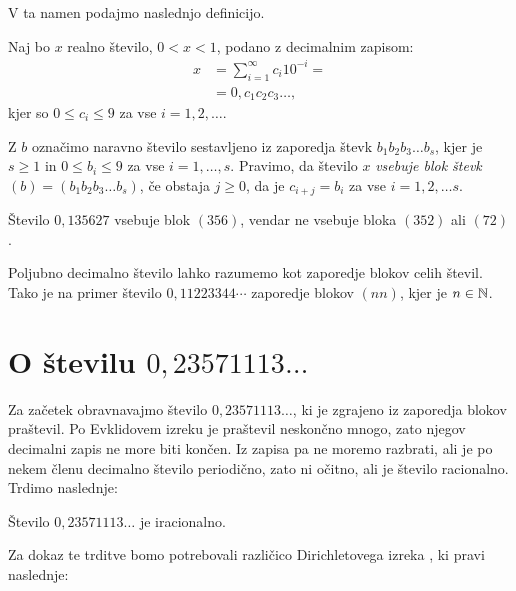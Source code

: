 \documentclass[twoside,11pt]{article}
\begin{document}
V ta namen podajmo naslednjo definicijo.

\begin{definicija}\label{defincija blokov}
    Naj bo $x$ realno število, $ 0 < x < 1$, podano z decimalnim zapisom: 
    \[ 
        \begin{split}
            x & = \sum^{\infty}_{i=1} c_i 10^{-i} = \\
            & = 0,c_1c_2c_3 \dots,
        \end{split}   
    \]
    kjer so $0 \leq c_i \leq 9$ za vse $i = 1, 2, \dots$.
    
    Z $b$ označimo naravno število sestavljeno iz zaporedja števk
    $b_1b_2b_3 \dots b_s$, 
    kjer je $s\geq 1$ in $0 \leq b_i \leq 9$ za vse $i = 1, \dots, s$.
    Pravimo, da število $x$ {\em vsebuje blok števk $(b) = (b_1b_2b_3 \dots b_s)$}, če obstaja $j \geq 0$, da je 
    $c_{i+j} = b_i$ za vse $i=1, 2, \dots s$.
\end{definicija}

\begin{zgled}
    Število $0,135627$ vsebuje blok $(356)$, vendar ne vsebuje bloka $(352)$ ali $(72)$.
\end{zgled}

Poljubno decimalno število lahko razumemo kot zaporedje blokov celih števil.
Tako je na primer število $0,11223344 \cdots$ zaporedje blokov $(nn)$,
kjer je $n \in \mathbb{N}$.


\section{O številu $0,23571113 \dots$}

Za začetek obravnavajmo število $0,23571113 \dots$, ki je zgrajeno iz zaporedja
blokov praštevil. 
Po Evklidovem izreku \cite{Euc} je praštevil neskončno mnogo,
zato njegov decimalni zapis ne more biti končen. 
Iz zapisa pa ne moremo razbrati, ali 
je po nekem členu decimalno število periodično, zato ni očitno, ali je število racionalno.
Trdimo naslednje:

\begin{trditev}\label{trditev praštevila}
    Število $0,23571113 \dots$ je iracionalno.
\end{trditev}

Za dokaz te trditve bomo potrebovali različico Dirichletovega izreka \cite{Vog}, ki pravi naslednje:
\end{document}
